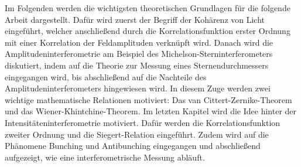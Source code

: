 Im Folgenden werden die wichtigsten theoretischen Grundlagen für die folgende Arbeit dargestellt. 
Dafür wird zuerst der Begriff der Kohärenz von Licht eingeführt, welcher anschließend durch die Korrelationsfunktion erster Ordnung mit einer Korrelation der Feldamplituden verknüpft wird. 
Danach wird die Amplitudeninterferometrie am Beispiel des Michelson-Sterninterferometers diskutiert, indem auf die Theorie zur Messung eines Sternendurchmessers eingegangen wird, bis abschließend auf die Nachteile des Amplitudeninterferometers hingewiesen wird. 
In diesem Zuge werden zwei wichtige mathematische Relationen motiviert: Das van Cittert-Zernike-Theorem und das Wiener-Khintchine-Theorem. 
Im letzten Kapitel wird die Idee hinter der Intensitäteninterferometrie motiviert. 
Dafür werden die Korrelationsfunktion zweiter Ordnung und die Siegert-Relation eingeführt. 
Zudem wird auf die Phänomene Bunching und Antibunching eingegangen und abschließend aufgezeigt, wie eine interferometrische Messung abläuft. 


